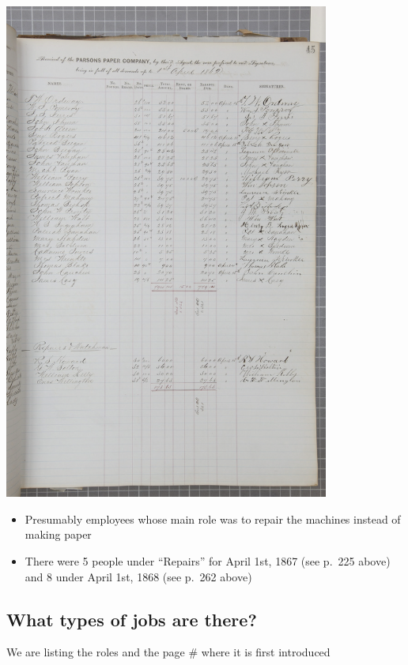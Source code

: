\documentclass[
  letterpaper,
  DIV=11,
  numbers=noendperiod]{scrartcl}
\begin{document}
\begin{itemize}
  \includegraphics[width=4.20833in,height=\textheight]{images/Screenshot 2023-02-13 at 4.18.46 PM.png}

  \begin{itemize}
  \item
    Presumably employees whose main role was to repair the machines
    instead of making paper
  \item
    There were 5 people under ``Repairs'' for April 1st, 1867 (see
    p.~225 above) and 8 under April 1st, 1868 (see p.~262 above)
  \end{itemize}
\end{itemize}

\hypertarget{what-types-of-jobs-are-there}{%
\subsection{What types of jobs are
there?}\label{what-types-of-jobs-are-there}}

We are listing the roles and the page \# where it is first introduced
\end{document}

